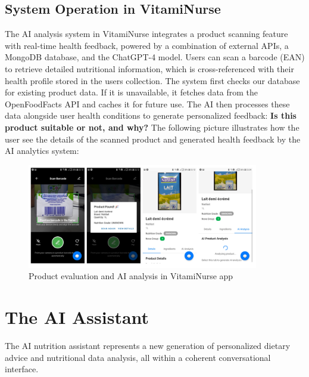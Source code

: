 \subsection{System Operation in VitamiNurse}
The AI analysis system in VitamiNurse integrates a product scanning feature with real-time health feedback, powered by a combination of external APIs, a MongoDB database, and the ChatGPT-4 model. Users can scan a barcode (EAN) to retrieve detailed nutritional information, which is cross-referenced with their health profile stored in the users collection. The system first checks our database for existing product data. If it is unavailable, it fetches data from the OpenFoodFacts API and caches it for future use. The AI then processes these data alongside user health conditions to generate personalized feedback: \textbf{Is this product suitable or not, and why?}
The following picture illustrates how the user see the details of the scanned product and generated health feedback by the AI analytics system:
\begin{center}
    \begin{figure}[H]
    \includegraphics[width=0.9\textwidth]{images/natilait.png}
    \caption{Product evaluation and AI analysis in VitamiNurse app}
    \label{fig:main_figure}
\end{figure}
\end{center}

\section{The AI Assistant}
The AI nutrition assistant represents a new generation of personalized dietary advice and nutritional data analysis, all within a coherent conversational interface.
